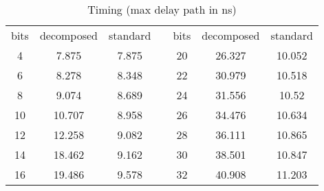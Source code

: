 \documentclass[a4paper]{article}
\begin{document}
\begin{table}%
\centering
    \caption{Timing (max delay path in ns)}
		\vspace{6pt}
   \begin{tabular}{ccccccc}
		\toprule
    bits	 & decomposed	 & standard && bits	 & decomposed	 & standard \\ 
    \cmidrule{1-3}\cmidrule{5-7} 
    4	 & 7.875	 & 7.875 && 20	 & 26.327	 & 10.052  \\ 
    6	 & 8.278	 & 8.348 && 22	 & 30.979	 & 10.518  \\ 
    8	 & 9.074	 & 8.689 && 24	 & 31.556	 & 10.52 \\ 
    10	 & 10.707	 & 8.958 && 26	 & 34.476	 & 10.634 \\ 
    12	 & 12.258	 & 9.082 && 28	 & 36.111	 & 10.865 \\ 
    14	 & 18.462	 & 9.162 && 30	 & 38.501	 & 10.847 \\ 
    16	 & 19.486	 & 9.578 && 32	 & 40.908	 & 11.203 \\ 
\bottomrule
    \end{tabular}
    \label{tab:fpga_timing}
\end{table}
\end{document}
